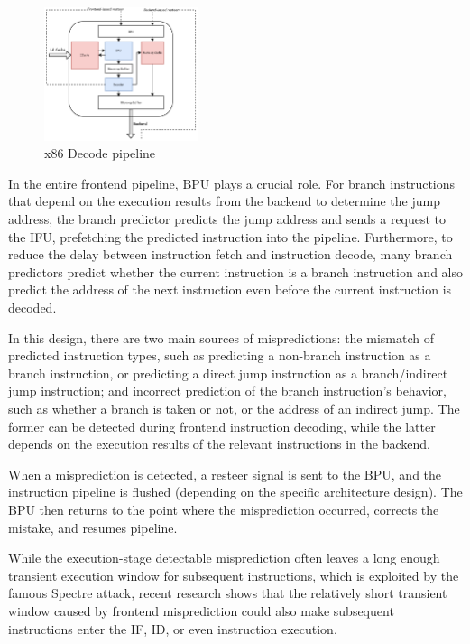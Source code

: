 \begin{figure}
    \centering
    \includegraphics[width=0.4\textwidth]{Figure/decode pipeline.png}
    \caption{x86 Decode pipeline}
    \label{fig:decode}
\end{figure}

In the entire frontend pipeline, BPU plays a crucial role. For branch instructions that depend on the execution results from the backend to determine the jump address, the branch predictor predicts the jump address and sends a request to the IFU, prefetching the predicted instruction into the pipeline. Furthermore, to reduce the delay between instruction fetch and instruction decode, many branch predictors predict whether the current instruction is a branch instruction and also predict the address of the next instruction even before the current instruction is decoded.

In this design, there are two main sources of mispredictions: the mismatch of predicted instruction types, such as predicting a non-branch instruction as a branch instruction, or predicting a direct jump instruction as a branch/indirect jump instruction; and incorrect prediction of the branch instruction's behavior, such as whether a branch is taken or not, or the address of an indirect jump. The former can be detected during frontend instruction decoding, while the latter depends on the execution results of the relevant instructions in the backend.

When a misprediction is detected, a resteer signal is sent to the BPU, and the instruction pipeline is flushed (depending on the specific architecture design). The BPU then returns to the point where the misprediction occurred, corrects the mistake, and resumes pipeline.

While the execution-stage detectable misprediction often leaves a long enough transient execution window for subsequent instructions, which is exploited by the famous Spectre attack\cite{spectre}, recent research\cite{phantom} shows that the relatively short transient window caused by frontend misprediction could also make subsequent instructions enter the IF, ID, or even instruction execution.


